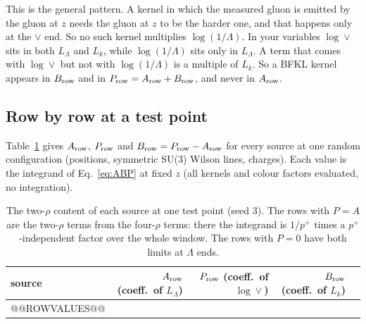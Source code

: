 \documentclass[10pt]{article}
\numberwithin{equation}{section}
\newcommand{\LL}{L_\Lambda}
\newcommand{\Lk}{L_k}
\begin{document}
This is the general pattern. A kernel in which the measured gluon is emitted by the gluon at $z$ needs the gluon at $z$ to be the harder one, and that happens only at the $\vee$ end. So no such kernel multiplies $\log(1/\Lambda)$. In your variables $\log\vee$ sits in both $\LL$ and $\Lk$, while $\log(1/\Lambda)$ sits only in $\LL$. A term that comes with $\log\vee$ but not with $\log(1/\Lambda)$ is a multiple of $\Lk$. So a BFKL kernel appears in $B_{\rm row}$ and in $P_{\rm row}=A_{\rm row}+B_{\rm row}$, and never in $A_{\rm row}$.

\subsection{Row by row at a test point}\label{sec:rowvalues}
Table~\ref{tab:rowvalues} gives $A_{\rm row}$, $P_{\rm row}$ and $B_{\rm row}=P_{\rm row}-A_{\rm row}$ for every source at one random configuration (positions, symmetric SU(3) Wilson lines, charges). Each value is the integrand of Eq.~\eqref{eq:ABP} at fixed $z$ (all kernels and colour factors evaluated, no integration).
\begin{table}[H]
\centering\small
\begin{tabular}{@{}l r r r l@{}}
source & $A_{\rm row}$ (coeff.\ of $\LL$) & $P_{\rm row}$ (coeff.\ of $\log\vee$) & $B_{\rm row}$ (coeff.\ of $\Lk$) & \\ \hline
@@ROWVALUES@@
\end{tabular}
\caption{The two-$\rho$ content of each source at one test point (seed 3). The rows with $P=A$ are the two-$\rho$ terms from the four-$\rho$ terms: there the integrand is $1/p^+$ times a $p^+$-independent factor over the whole window. The rows with $P=0$ have both limits at $\Lambda$ ends.}
\label{tab:rowvalues}
\end{table}

\end{document}

